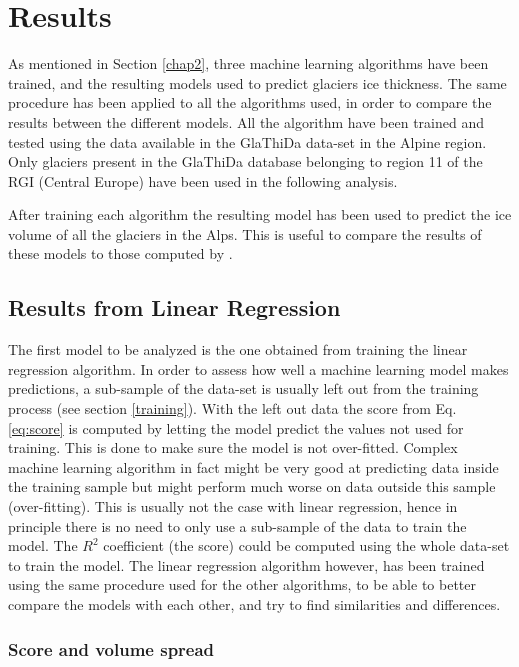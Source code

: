\chapter{Results}\label{chap3}
\thispagestyle{plain}

As mentioned in Section \ref{chap2}, three machine learning algorithms have been trained, and the resulting models used to predict glaciers ice thickness. The same procedure has been applied to all the algorithms used, in order to compare the results between the different models. 
All the algorithm have been trained and tested using the data available in the GlaThiDa data-set in the Alpine region. Only glaciers present in the GlaThiDa database belonging to region 11 of the RGI (Central Europe) have been used in the following analysis.

After training each algorithm the resulting model has been used to predict the ice volume of all the glaciers in the Alps. This is useful to compare the results of these models to those computed by \citet{Farinotti2019}.

\section{Results from Linear Regression}\label{linear}
The first model to be analyzed is the one obtained from training the linear regression algorithm. In order to assess how well a machine learning model makes predictions, a sub-sample of the data-set is usually left out from the training process (see section \ref{training}). With the left out data the score from Eq. \ref{eq:score} is computed by letting the model predict the values not used for training. This is done to make sure the model is not over-fitted. Complex machine learning algorithm in fact might be very good at predicting data inside the training sample but might perform much worse on data outside this sample (over-fitting). 
This is usually not the case with linear regression, hence in principle there is no need to only use a sub-sample of the data to train the model. The $R^2$ coefficient (the score) could be computed using the whole data-set to train the model. The linear regression algorithm however, has been trained using the same procedure used for the other algorithms, to be able to better compare the models with each other, and try to find similarities and differences.     

\subsection{Score and volume spread}\label{lr-score}

